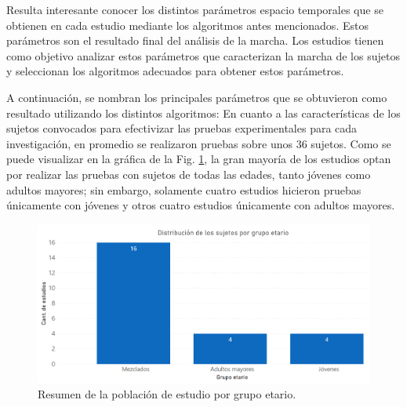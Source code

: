 Resulta interesante conocer los distintos parámetros espacio temporales que se obtienen en cada estudio mediante los algoritmos antes mencionados. Estos parámetros son el resultado final del análisis de la marcha. Los estudios tienen como objetivo analizar estos parámetros que caracterizan la marcha de los sujetos y seleccionan los algoritmos adecuados para obtener estos parámetros. 

A continuación, se nombran los principales parámetros que se obtuvieron como resultado utilizando los distintos algoritmos:
\newline\newline
\noindent{}
\newline\newline
En cuanto a las características de los sujetos convocados para efectivizar las pruebas experimentales para cada investigación, en promedio se realizaron pruebas sobre unos 36 sujetos. Como se puede visualizar en la gráfica de la Fig. \ref{fig:subjects-age}, la gran mayoría de los estudios optan por realizar las pruebas con sujetos de todas las edades, tanto jóvenes como adultos mayores; sin embargo, solamente cuatro estudios hicieron pruebas únicamente con jóvenes y otros cuatro estudios únicamente con adultos mayores. 

\newpage

\begin{figure}[H]
\includegraphics[width=\textwidth]{TESIS/imagenes/chap03/sintesis_grupoEtario.PNG}
\caption{Resumen de la población de estudio por grupo etario.}\label{fig:subjects-age}
\end{figure}

